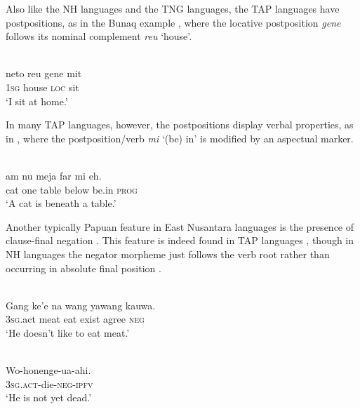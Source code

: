 Also like the NH languages and the TNG languages, the TAP languages have postpositions, as in the Bunaq example , where the locative postposition \textit{gene} follows its nominal complement \textit{reu} `house'.





 
\ea%
\label{ex:4:28}
 \\
\gll   neto  reu  gene  mit\\ 
\textsc{1sg}  house  \textsc{loc}  sit\\  
\glt `I sit at home.'  \\

\z
 




In many TAP languages, however, the postpositions display verbal properties, as in , where the postposition/verb \textit{mi} `(be) in' is modified by an aspectual marker.


\ea%
\label{ex:4:29}
 \\
\gll  {\textglotstop}am{\textopeno} nu meja far mi eh. \\
   cat one table below be.in \textsc{prog} \\
\glt `A cat is beneath a table.'
\z





Another typically Papuan feature in East Nusantara languages is the presence of clause-final negation \citep{KlamerEtAl2008}. This feature is indeed found in TAP languages , though in NH languages the negator morpheme just follows the verb root rather than occurring in absolute final position .


\ea%
\label{ex:4:30}
 \\
\gll  Gang ke'e na wang yawang kauwa. \\
  \textsc{3sg}.act meat eat exist agree \textsc{neg} \\
\glt `He doesn't like to eat meat.'
\z






\ea%
\label{ex:4:31}
 \\
\gll  Wo-honenge-ua-ahi. \\
 \textsc{3sg.act}-die-\textsc{neg-ipfv}  \\
\glt `He is not yet dead.'

